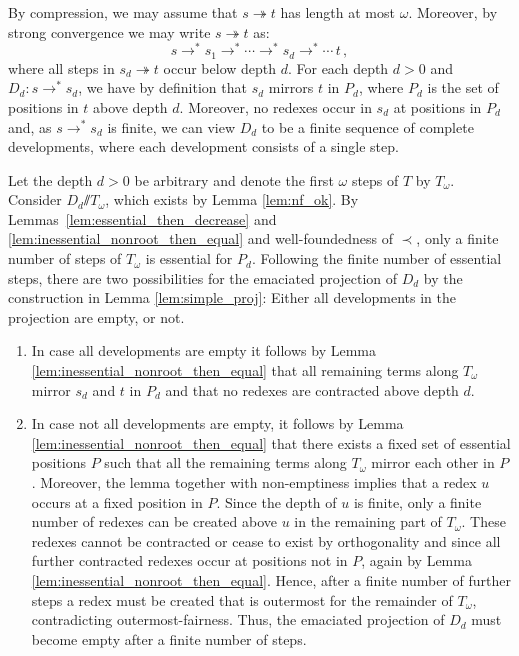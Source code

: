\documentclass{LMCS}
\theoremstyle{definition}
\newcommand{\rewt}{\rightarrow^*}
\newcommand{\trewt}{\twoheadrightarrow}
\newcommand{\emmy}{\mathord{\sslash}}
\begin{document}
\proof
By compression, we may assume that $s \trewt t$ has length at most $\omega$. Moreover, by strong convergence we may write $s \trewt t$ as:
\[
s \rewt s_1 \rewt \cdots \rewt s_d \rewt \cdots \, t \, ,
\]
where all steps in $s_d \trewt t$ occur below depth $d$. For each depth $d > 0$ and $D_d : s \rewt s_d$, we have by definition that $s_d$ mirrors $t$ in $P_d$, where $P_d$ is the set of positions in $t$ above depth $d$. Moreover, no redexes occur in $s_d$ at positions in $P_d$ and, as $s \rewt s_d$ is finite, we can view $D_d$ to be a finite sequence of complete developments, where each development consists of a single step.

Let the depth $d > 0$ be arbitrary and denote the first $\omega$ steps of $T$ by $T_\omega$. Consider $D_d \emmy T_\omega$, which exists by Lemma \ref{lem:nf_ok}. By Lemmas~\ref{lem:essential_then_decrease} and \ref{lem:inessential_nonroot_then_equal} and well-foundedness of $\prec$, only a finite number of steps of $T_\omega$ is essential for $P_d$. Following the finite number of essential steps, there are two possibilities for the emaciated projection of $D_d$ by the construction in Lemma \ref{lem:simple_proj}: Either all developments in the projection are empty, or not.
\begin{enumerate}[$\bullet$]
\item
In case all developments are empty it follows by Lemma \ref{lem:inessential_nonroot_then_equal} that all remaining terms along $T_\omega$ mirror $s_d$ and $t$ in $P_d$ and that no redexes are contracted above depth $d$.
\item
 In case not all developments are empty, it follows by Lemma \ref{lem:inessential_nonroot_then_equal} that there exists a fixed set of essential positions $P$ such that all the remaining terms along $T_\omega$ mirror each other in $P$. Moreover, the lemma together with non-emptiness implies that a redex $u$ occurs at a fixed position in $P$. Since the depth of $u$ is finite, only a finite number of redexes can be created above $u$ in the remaining part of $T_\omega$. These redexes cannot be contracted or cease to exist by orthogonality and since all further contracted redexes occur at positions not in $P$, again by Lemma \ref{lem:inessential_nonroot_then_equal}. Hence, after a finite number of further steps a redex must be created that is outermost for the remainder of $T_\omega$, contradicting outermost-fairness. Thus, the emaciated projection of $D_d$ must become empty after a finite number of steps.
\end{enumerate}
\end{document}
